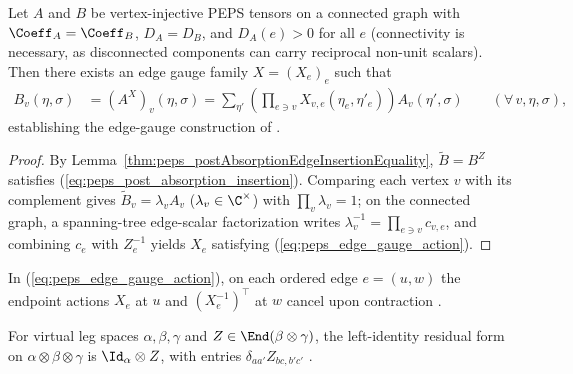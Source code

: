 \begin{lemma}%
    \label{thm:gaugeConsistency}
    \leanok
    Let $A$ and $B$ be vertex-injective PEPS tensors on a connected graph with
    $\Coeff_A=\Coeff_B$, $D_A=D_B$, and $D_A(e)>0$ for all $e$ (connectivity is
    necessary, as disconnected components can carry reciprocal non-unit scalars).
    Then there exists an edge gauge family $X=(X_e)_e$ such that
    \begin{align}
        B_v(\eta,\sigma)
         & =
        (A^X)_v(\eta,\sigma)
        =
        \sum_{\eta'}
        \left(\prod_{e\ni v}X_{v,e}(\eta_e,\eta'_e)\right)
        A_v(\eta',\sigma)
        \qquad (\forall\,v,\eta,\sigma),
        \label{eq:peps_edge_gauge_action}
    \end{align}
    establishing the edge-gauge construction of
    \cite[Section~3]{Molnar2018NormalPEPS}.
\end{lemma}
\begin{proof}\leanok
    By Lemma~\ref{thm:peps_postAbsorptionEdgeInsertionEquality}, $\widetilde B=B^Z$
    satisfies (\ref{eq:peps_post_absorption_insertion}). Comparing each vertex
    $v$ with its complement gives $\widetilde B_v=\lambda_v A_v$ ($\lambda_v\in\C^\times$)
    with $\prod_v\lambda_v=1$; on the connected graph, a spanning-tree edge-scalar
    factorization writes $\lambda_v^{-1}=\prod_{e\ni v}c_{v,e}$, and combining
    $c_e$ with $Z_e^{-1}$ yields $X_e$ satisfying (\ref{eq:peps_edge_gauge_action}).
\end{proof}

\begin{remark}
    In (\ref{eq:peps_edge_gauge_action}), on each ordered edge $e=(u,w)$ the
    endpoint actions $X_e$ at $u$ and $(X_e^{-1})^\top$ at $w$ cancel upon
    contraction \cite[Section~3]{Molnar2018NormalPEPS}.
\end{remark}

\begin{definition}%
    \label{def:peps_threeLegLeftIdentityForm}
    \leanok
    For virtual leg spaces $\alpha,\beta,\gamma$ and $Z\in\End(\beta\otimes\gamma)$,
    the left-identity residual form on $\alpha\otimes\beta\otimes\gamma$ is
    $\Id_\alpha\otimes Z$, with entries $\delta_{aa'}Z_{bc,b'c'}$
    \cite[Section~3]{Molnar2018NormalPEPS}.
\end{definition}

